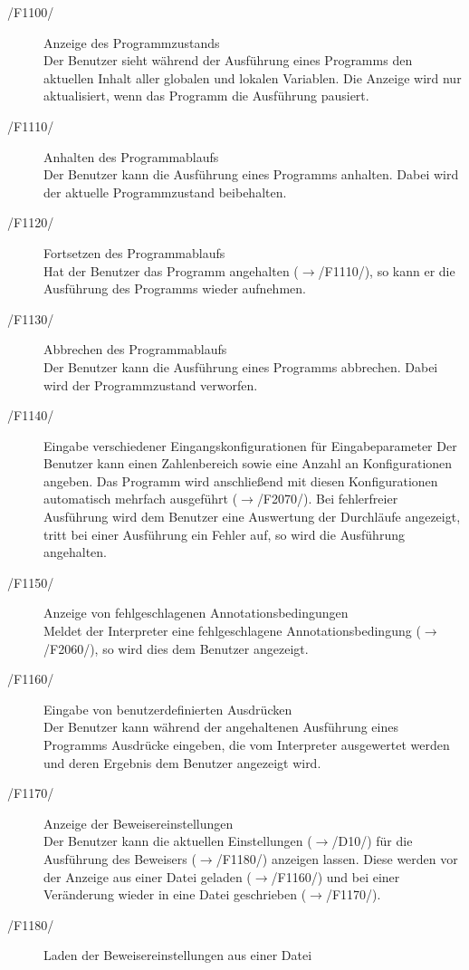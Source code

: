 \documentclass[a4paper,10pt]{article}
\begin{document}
\begin{description}
\item[/F1100/] Anzeige des Programmzustands\\
Der Benutzer sieht w\"{a}hrend der Ausf\"{u}hrung eines Programms den aktuellen Inhalt aller globalen und lokalen Variablen. Die Anzeige wird nur aktualisiert, wenn das Programm die Ausf\"{u}hrung pausiert.
\item[/F1110/] Anhalten des Programmablaufs\\
Der Benutzer kann die Ausf\"{u}hrung eines Programms anhalten. Dabei wird der aktuelle Programmzustand beibehalten.
\item[/F1120/] Fortsetzen des Programmablaufs\\
Hat der Benutzer das Programm angehalten ($\to$/F1110/), so kann er die Ausf\"{u}hrung des Programms wieder aufnehmen.
\item[/F1130/] Abbrechen des Programmablaufs\\
Der Benutzer kann die Ausf\"{u}hrung eines Programms abbrechen. Dabei wird der Programmzustand verworfen.
\item[/F1140/] Eingabe verschiedener Eingangskonfigurationen f\"{u}r Eingabeparameter
Der Benutzer kann einen Zahlenbereich sowie eine Anzahl an Konfigurationen angeben. Das Programm wird anschlie\ss{}end mit diesen Konfigurationen automatisch mehrfach ausgef\"{u}hrt ($\to$/F2070/). Bei fehlerfreier Ausf\"{u}hrung wird dem Benutzer eine Auswertung der Durchl\"{a}ufe angezeigt, tritt bei einer Ausf\"{u}hrung ein Fehler auf, so wird die Ausf\"{u}hrung angehalten.
\item[/F1150/] Anzeige von fehlgeschlagenen Annotationsbedingungen\\
Meldet der Interpreter eine fehlgeschlagene Annotationsbedingung ($\to$/F2060/), so wird dies dem Benutzer angezeigt.
\item[/F1160/] Eingabe von benutzerdefinierten Ausdr\"{u}cken\\
Der Benutzer kann w\"{a}hrend der angehaltenen Ausf\"{u}hrung eines Programms Ausdr\"{u}cke eingeben, die vom Interpreter ausgewertet werden und deren Ergebnis dem Benutzer angezeigt wird.
\item[/F1170/] Anzeige der Beweisereinstellungen\\
Der Benutzer kann die aktuellen Einstellungen ($\to$/D10/) f\"{u}r die Ausf\"{u}hrung des Beweisers ($\to$/F1180/) anzeigen lassen. Diese werden vor der Anzeige aus einer Datei geladen ($\to$/F1160/) und bei einer Ver\"{a}nderung wieder in eine Datei geschrieben ($\to$/F1170/).
\item[/F1180/] Laden der Beweisereinstellungen aus einer Datei\\

\end{description}
\end{document}
